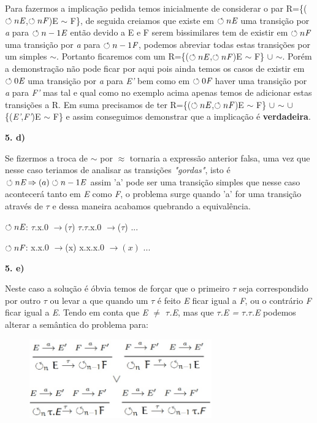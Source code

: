 \documentclass[11pt,a4paper]{report}
\begin{document}
Para fazermos a implicação pedida temos inicialmente de considerar o par R=\{($\circlearrowleft n \emph{E}$,$\circlearrowleft n \emph{F}$)\textbar E $\sim$ F\}, de seguida creiamos que existe em $\circlearrowleft n \emph{E}$ uma transição por \emph{a} para $\circlearrowleft n-1 \emph{E}$ então devido a E e F serem bissimilares tem de existir em $\circlearrowleft n \emph{F}$ uma transição por \emph{a} para $\circlearrowleft n-1 \emph{F}$, podemos abreviar todas estas transições por um simples $\sim$. Portanto ficaremos com um R=\{($\circlearrowleft n \emph{E}$,$\circlearrowleft n \emph{F}$)\textbar E $\sim$ F\} $\cup$ $\sim$. Porém a demonstração não pode ficar por aqui pois ainda temos os casos de existir em $\circlearrowleft 0 \emph{E}$ uma transição por \emph{a} para \emph{E'} bem como em $\circlearrowleft 0 \emph{F}$ haver uma transição por \emph{a} para \emph{F'} mas tal e qual como no exemplo acima apenas temos de adicionar estas transições a R. Em suma precisamos de ter R=\{($\circlearrowleft n \emph{E}$,$\circlearrowleft n \emph{F}$)\textbar E $\sim$ F\} $\cup$ $\sim$ $\cup$ \{(\emph{E'},\emph{F'})\textbar E $\sim$ F\} e assim conseguimos demonstrar que a implicação é \textbf{verdadeira}.

\textbf{5. d)} 

Se fizermos a troca de $\sim$ por $\approx$ tornaria a expressão anterior falsa, uma vez que nesse caso teriamos de analisar as transições \emph{"gordas"}, isto é $\circlearrowleft n \emph{E} \Rightarrow(a) \circlearrowleft n-1 \emph{E}$ assim 'a' pode ser uma transição simples que nesse caso acontecerá tanto em \emph{E} como \emph{F}, o problema surge quando 'a' for uma transição através de $\tau$ e dessa maneira acabamos quebrando a equivalência.

 $\circlearrowleft n \emph{E}$: $\tau$.x.0 $\rightarrow$($\tau$) $\tau$.$\tau$.x.0 $\rightarrow$($\tau$) ...

 $\circlearrowleft n \emph{F}$: x.x.0 $\rightarrow$(x) x.x.x.0 $\rightarrow(x)$ ...
 
\textbf{5. e)} 

Neste caso a solução é óbvia temos de forçar que o primeiro $\tau$ seja correspondido por outro $\tau$ ou levar a que quando um $\tau$ é feito \emph{E} ficar igual a \emph{F}, ou o contrário \emph{F} ficar igual a \emph{E}.
Tendo em conta que \emph{E $\neq$ $\tau$.E}, mas que \emph{$\tau$.E = $\tau$.$\tau$.E} podemos alterar a semântica do problema para:

\begin{figure} [h]
        \centering
		\includegraphics[width=0.70\textwidth]{Ex5.jpeg}\par\vspace{1cm}
\end{figure}
\end{document}
